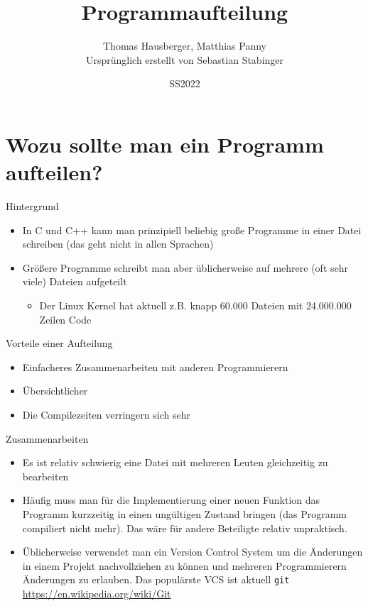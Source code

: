 \documentclass[presentation]{beamer}
\author{Thomas Hausberger, Matthias Panny \\ Ursprünglich erstellt von Sebastian Stabinger}
\date{SS2022}
\title{Programmaufteilung}
\begin{document}
\maketitle

\section{Wozu sollte man ein Programm aufteilen?}
\label{sec:orge157b3e}
\begin{frame}[label={sec:orgafbbfc8}]{Hintergrund}
\begin{itemize}
\item In C und C++ kann man prinzipiell beliebig große Programme in einer
Datei schreiben (das geht nicht in allen Sprachen)
\item Größere Programme schreibt man aber üblicherweise auf mehrere (oft
sehr viele) Dateien aufgeteilt
\begin{itemize}
\item Der Linux Kernel hat aktuell z.B. knapp 60.000 Dateien mit
24.000.000 Zeilen Code
\end{itemize}
\end{itemize}
\begin{block}{Vorteile einer Aufteilung}
\begin{itemize}
\item Einfacheres Zusammenarbeiten mit anderen Programmierern
\item Übersichtlicher
\item Die Compilezeiten verringern sich sehr
\end{itemize}
\end{block}
\end{frame}
\begin{frame}[label={sec:orgb241b0a},fragile]{Zusammenarbeiten}
 \begin{itemize}
\item Es ist relativ schwierig eine Datei mit mehreren Leuten gleichzeitig
zu bearbeiten
\item Häufig muss man für die Implementierung einer neuen Funktion das
Programm \alert{kurzzeitig in einen ungültigen Zustand bringen} (das
Programm compiliert nicht mehr). Das wäre für andere Beteiligte
relativ unpraktisch.
\item Üblicherweise verwendet man ein \alert{Version Control System} um die
Änderungen in einem Projekt nachvollziehen zu können und mehreren
Programmierern Änderungen zu erlauben. Das populärste VCS ist
aktuell {\color{solarizedYellow}\verb!git!} \url{https://en.wikipedia.org/wiki/Git}
\end{itemize}
\end{frame}
\end{document}
